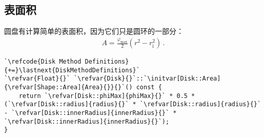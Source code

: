 \subsection{表面积}\label{sub:表面积4}
圆盘有计算简单的表面积，因为它们只是圆环的一部分：
\begin{align*}
    A=\frac{\varphi_{\max}}{2}(r^2-r_{\mathrm{i}}^2)\, .
\end{align*}
\begin{lstlisting}
`\refcode{Disk Method Definitions}{+=}\lastnext{DiskMethodDefinitions}`
`\refvar{Float}{}` `\refvar{Disk}{}`::`\initvar[Disk::Area]{\refvar[Shape::Area]{Area}{}}{}`() const { 
    return `\refvar[Disk::phiMax]{phiMax}{}` * 0.5 * (`\refvar[Disk::radius]{radius}{}` * `\refvar[Disk::radius]{radius}{}` - `\refvar[Disk::innerRadius]{innerRadius}{}` * `\refvar[Disk::innerRadius]{innerRadius}{}`);
}
\end{lstlisting}